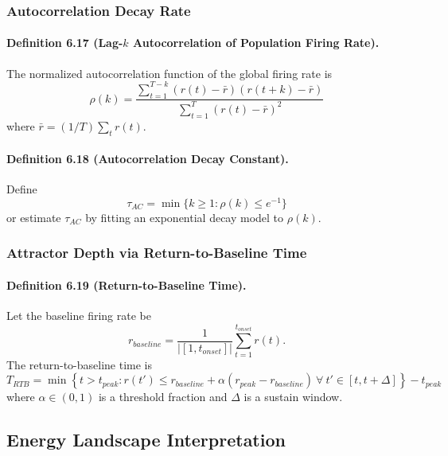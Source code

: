 \subsubsection{Autocorrelation Decay Rate}

\paragraph{Definition 6.17 (Lag-$k$ Autocorrelation of Population Firing Rate).}
The normalized autocorrelation function of the global firing rate is
\begin{equation}
\rho(k)=\frac{\sum_{t=1}^{T-k}(r(t)-\bar{r})(r(t+k)-\bar{r})}{\sum_{t=1}^{T}(r(t)-\bar{r})^2}
\end{equation}
where $\bar{r}=(1/T)\sum_t r(t)$.

\paragraph{Definition 6.18 (Autocorrelation Decay Constant).}
Define
\begin{equation}
\tau_{AC}=\min\{k\ge 1: \rho(k)\le e^{-1}\}
\end{equation}
or estimate $\tau_{AC}$ by fitting an exponential decay model to $\rho(k)$.

\subsubsection{Attractor Depth via Return-to-Baseline Time}

\paragraph{Definition 6.19 (Return-to-Baseline Time).}
Let the baseline firing rate be
\begin{equation}
r_{baseline}=\frac{1}{|[1,t_{onset}]|}\sum_{t=1}^{t_{onset}} r(t).
\end{equation}
The return-to-baseline time is
\begin{equation}
T_{RTB}=\min\left\{t>t_{peak}: r(t')\le r_{baseline}+\alpha(r_{peak}-r_{baseline})\ \forall\ t'\in[t,t+\Delta]\right\}-t_{peak}
\end{equation}
where $\alpha\in(0,1)$ is a threshold fraction and $\Delta$ is a sustain window.

\subsection{Energy Landscape Interpretation}

